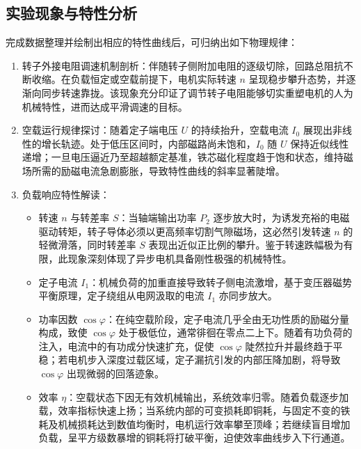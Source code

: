 \begin{framed}
{			\subsection{实验现象与特性分析}
			完成数据整理并绘制出相应的特性曲线后，可归纳出如下物理规律：
			\begin{enumerate}
				\item 转子外接电阻调速机制剖析：伴随转子侧附加电阻的逐级切除，回路总阻抗不断收缩。在负载恒定或空载前提下，电机实际转速 $n$ 呈现稳步攀升态势，并逐渐向同步转速靠拢。该现象充分印证了调节转子电阻能够切实重塑电机的人为机械特性，进而达成平滑调速的目标。
				\item 空载运行规律探讨：随着定子端电压 $U$ 的持续抬升，空载电流 $I_0$ 展现出非线性的增长轨迹。处于低压区间时，内部磁路尚未饱和，$I_0$ 随 $U$ 保持近似线性递增；一旦电压逼近乃至超越额定基准，铁芯磁化程度趋于饱和状态，维持磁场所需的励磁电流急剧膨胀，导致特性曲线的斜率显著陡增。
				\item 负载响应特性解读：
				\begin{itemize}
					\item 转速 $n$ 与转差率 $S$：当轴端输出功率 $P_2$ 逐步放大时，为诱发充裕的电磁驱动转矩，转子导体必须以更高频率切割气隙磁场，这必然引发转速 $n$ 的轻微滑落，同时转差率 $S$ 表现出近似正比例的攀升。鉴于转速跌幅极为有限，此现象深刻体现了异步电机具备刚性极强的机械特性。
					\item 定子电流 $I_1$：机械负荷的加重直接导致转子侧电流激增，基于变压器磁势平衡原理，定子绕组从电网汲取的电流 $I_1$ 亦同步放大。
					\item 功率因数 $\cos\varphi$：在纯空载阶段，定子电流几乎全由无功性质的励磁分量构成，致使 $\cos\varphi$ 处于极低位，通常徘徊在零点二上下。随着有功负荷的注入，电流中的有功成分快速扩充，促使 $\cos\varphi$ 陡然拉升并最终趋于平稳；若电机步入深度过载区域，定子漏抗引发的内部压降加剧，将导致 $\cos\varphi$ 出现微弱的回落迹象。
					\item 效率 $\eta$：空载状态下因无有效机械输出，系统效率归零。随着负载逐步加载，效率指标快速上扬；当系统内部的可变损耗即铜耗，与固定不变的铁耗及机械损耗达到数值均衡时，电机运行效率攀至顶峰；若继续盲目增加负载，呈平方级数暴增的铜耗将打破平衡，迫使效率曲线步入下行通道。
				\end{itemize}
			\end{enumerate}
			
		}
	\end{framed}
	
